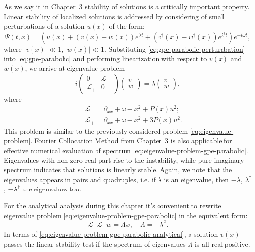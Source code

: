 As we say it in Chapter~3 stability of solutions is a critically important property.
Linear stability of localized solutions is addressed by considering of small perturbations of a solution $u(x)$ of the form:
\begin{equation}
	\Psi(t, x) = \left( u(x) + (v(x) + w(x)) e^{\lambda t} + (v^{\dagger}(x) - w^{\dagger}(x)) e^{\lambda^{\dagger} t} \right) e^{-i \omega t},
\label{eq:gpe-parabolic-perturabation}
\end{equation}
where $|v(x)| \ll 1$, $|w(x)| \ll 1$.
Substituting \eqref{eq:gpe-parabolic-perturabation} into \eqref{eq:gpe-parabolic} and performing linearization with respect to $v(x)$ and $w(x)$, we arrive at eigenvalue problem
\begin{equation}
	i
	\begin{pmatrix}
		0 & \mathcal{L}_- \\
		\mathcal{L}_+ & 0
	\end{pmatrix}
	\begin{pmatrix}
		v \\ w
	\end{pmatrix} =
	\lambda
	\begin{pmatrix}
		v \\ w	
	\end{pmatrix},
\label{eq:eigenvalue-problem-gpe-parabolic}
\end{equation}
where 
\begin{eqnarray*}
	&& \mathcal{L}_- = \partial_{xx} + \omega -x^2 + P(x) u^2; \\
	&& \mathcal{L}_+ = \partial_{xx} + \omega -x^2 + 3 P(x) u^2.
\end{eqnarray*}
This problem is similar to the previously considered problem \eqref{eq:eigenvalue-problem}.
Fourier Collocation Method from Chapter~3 is also applicable for effective numerical evaluation of spectrum \eqref{eq:eigenvalue-problem-gpe-parabolic}.
Eigenvalues with non-zero real part rise to the instability, while pure imaginary spectrum indicates that solutions is linearly stable.
Again, we note that the eigenvalues appears in pairs and quadruples, i.e. if $\lambda$ is an eigenvalue, then $-\lambda$, $\lambda^{\dagger}$, $-\lambda^{\dagger}$ are eigenvalues too.

For the analytical analysis during this chapter it's convenient to rewrite eigenvalue problem \eqref{eq:eigenvalue-problem-gpe-parabolic} in the equivalent form:
\begin{equation}
	\mathcal{L}_+ \mathcal{L}_- w = \Lambda w, \quad \Lambda = -\lambda^2.
\label{eq:eigenvalue-problem-gpe-parabolic-analytical}
\end{equation}
In terms of \eqref{eq:eigenvalue-problem-gpe-parabolic-analytical}, a solution $u(x)$ passes the linear stability test if the spectrum of eigenvalues $\Lambda$ is all-real positive.

